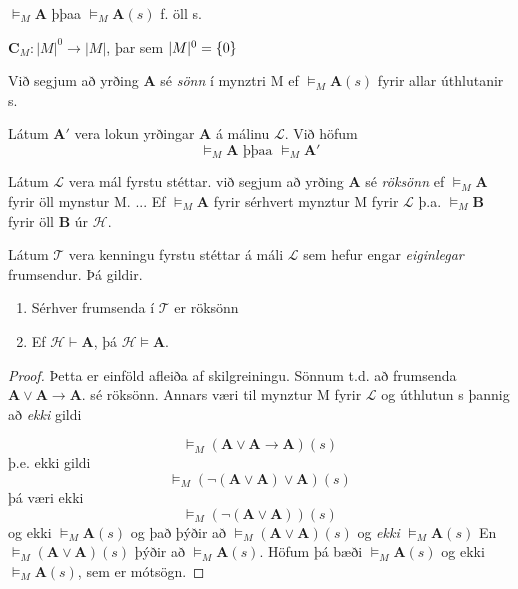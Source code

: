 \documentclass[12pt]{article}
\begin{document}
\begin{skgr}
  $\models_{M} \mathbf{A}$ þþaa $\models_{M} \mathbf{A}(s)$ f. öll s.
\end{skgr}

\begin{ath}
 $\mathbf{C}_{M}: |M|^{0} \rightarrow |M|$, þar sem $|M|^{0} = \{0\}$
\end{ath}




Við segjum að yrðing $\mathbf{A}$ sé \emph{sönn} í mynztri M ef
\( \models_{M} \mathbf{A} (s) \) fyrir allar úthlutanir s.

\begin{ath}
  Látum \(\mathbf{A}'\) vera lokun yrðingar \(\mathbf{A}\) á málinu
\(\mathcal{L} \). Við höfum
\[ \models_{M} \mathbf{A} \text{ þþaa } \models_{M} \mathbf{A}' \]
\end{ath}

\begin{skgr}
  Látum \( \mathcal{L} \) vera mál fyrstu stéttar. við segjum að yrðing $\mathbf{A}$
sé \emph{röksönn} ef  $\models_{M}\mathbf{A}$ fyrir öll mynstur M.
...
Ef \(\models_{M}\mathbf{A}\) fyrir sérhvert mynztur M fyrir \(\mathcal{L}\)
þ.a. $\models_{M} \mathbf{B}$ fyrir öll $\mathbf{B}$ úr $\mathcal{H}$. 
\end{skgr}


\begin{setn}
  Látum $\mathcal{T}$ vera kenningu fyrstu stéttar á máli \(\mathcal{L}\) sem
  hefur engar \emph{eiginlegar} frumsendur. Þá gildir.
  \begin{enumerate}[(1)]
  \item  Sérhver frumsenda í $\mathcal{T}$ er röksönn
  \item Ef $\mathcal{H} \vdash \mathbf{A}$, þá $\mathcal{H} \models \mathbf{A}$.
  \end{enumerate}

\end{setn}

\begin{proof}
  Þetta er einföld afleiða af skilgreiningu.
  Sönnum t.d. að frumsenda $\mathbf{A} \vee \mathbf{A} \rightarrow \mathbf{A}$.
  sé röksönn. Annars væri til mynztur M fyrir $\mathcal{L}$ og úthlutun s þannig að
  \emph{ekki} gildi 

  \[ \models_{M} (\mathbf{A} \vee \mathbf{A} \rightarrow \mathbf{A}) (s) \]
  þ.e. ekki gildi
  \[ \models_{M} ( \lnot ( \mathbf{A} \vee \mathbf{A} ) \vee \mathbf{A}) (s) \]
  þá væri ekki
  \[\models_{M} ( \lnot (\mathbf{A} \vee \mathbf{A}))(s)\] og ekki $\models_{M} \mathbf{A}(s)$
  og það þýðir að  \( \models_{M} (\mathbf{A} \vee \mathbf{A}) (s) \) og \emph{ekki} $\models_{M} \mathbf{A} (s)$
  En $\models_{M}( \mathbf{A} \vee \mathbf{A}) (s)$ þýðir að $\models_{M} \mathbf{A}(s)$. Höfum þá bæði
  $\models_{M} \mathbf{A}(s)$ og ekki $\models_{M} \mathbf{A}(s)$, sem er mótsögn.
\end{proof}
\end{document}
